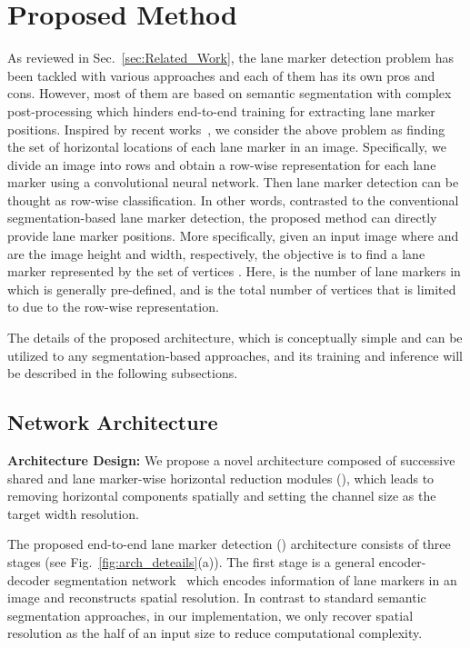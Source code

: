 \documentclass[10pt,twocolumn,letterpaper]{article}
\begin{document}
\section{Proposed Method}

As reviewed in Sec.~\ref{sec:Related_Work}, the lane marker detection problem has been tackled with various approaches and each of them has its own pros and cons. However, most of them are based on semantic segmentation with complex post-processing which hinders end-to-end training for extracting lane marker positions.
Inspired by recent works~\cite{Drivable, StixelNet}, we consider the above problem as finding the set of horizontal locations of each lane marker in an image.
Specifically, we divide an image into rows and obtain a row-wise representation for each lane marker using a convolutional neural network. Then lane marker detection can be thought as row-wise classification. In other words, contrasted to the conventional segmentation-based lane marker detection, the proposed method can directly provide lane marker positions.
More specifically, given an input image  where  and  are the image height and width, respectively, the objective is to find a lane marker   represented by the set of vertices  .
Here,  is the number of lane markers in  which is generally pre-defined, and  is the total number of vertices that is limited to  due to the row-wise representation.



The details of the proposed architecture, which is conceptually simple and can be utilized to any segmentation-based approaches, and its training and inference will be described in the following subsections.

\subsection{Network Architecture}\label{sec:net_arc}

\textbf{Architecture Design:} We propose a novel architecture composed of successive shared and lane marker-wise horizontal reduction modules (\reductionnames), which leads to removing horizontal components spatially and setting the channel size as the target width resolution.


The proposed end-to-end lane marker detection (\textbf{\algorithmname}) architecture consists of three stages (see Fig.~\ref{fig:arch_deteails}(a)). The first stage is a general encoder-decoder segmentation network~\cite{UNet} which encodes information of lane markers in an image and reconstructs spatial resolution. In contrast to standard semantic segmentation approaches, in our implementation, we only recover spatial resolution as the half of an input size to reduce computational complexity. 
\end{document}
